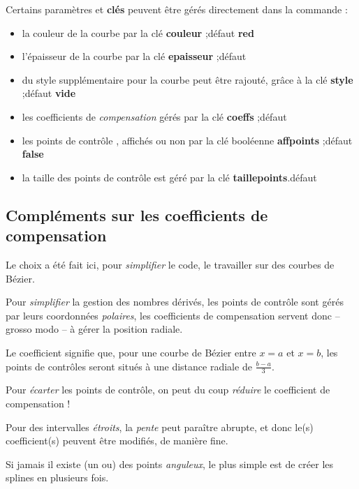 \documentclass{article}
\newcommand\ctex[1]{\tcbox[vignettelatex]{#1}}
\newcommand\Cle[1]{{\bfseries\sffamily\textlangle #1\textrangle}}
\begin{document}
\begin{codecles}
Certains paramètres et \Cle{clés} peuvent être gérés directement dans la commande \ctex{splinetikz} :
%
\begin{itemize}
	\item la couleur de la courbe par la {clé} \Cle{couleur} ;\hfill{}défaut \Cle{red}
	\item l'épaisseur de la courbe par la {clé} \Cle{epaisseur} ;\hfill{}défaut \Cle{1.25pt}
	\item du style supplémentaire pour la courbe peut être rajouté, grâce à la {clé} \Cle{style} ;\hfill{}défaut \Cle{vide}
	\item les coefficients de \textit{compensation} gérés par la {clé} \Cle{coeffs} ;\hfill{}défaut \Cle{3}
	\item les points de contrôle , affichés ou non par la {clé booléenne} \Cle{affpoints} ;\hfill{}défaut \Cle{false}
	\item la taille des points de contrôle est géré par la {clé} \Cle{taillepoints}.\hfill{}défaut \Cle{2pt}
\end{itemize}
\end{codecles}

\subsection{Compléments sur les coefficients de \og compensation \fg}

\begin{codeidee}
Le choix a été fait ici, pour \textit{simplifier} le code, le travailler sur des courbes de Bézier.

Pour \textit{simplifier} la gestion des nombres dérivés, les points de contrôle sont gérés par leurs coordonnées \textit{polaires}, les \textsf{coefficients de compensation} servent donc -- grosso modo -- à gérer la position radiale.

\smallskip

Le coefficient \Cle{3} signifie que, pour une courbe de Bézier entre $x=a$ et $x=b$, les points de contrôles seront situés à une distance radiale de $\frac{b-a}{3}$.

Pour \textit{écarter} les points de contrôle, on peut du coup \textit{réduire} le coefficient de compensation !

\medskip

Pour des intervalles \textit{étroits}, la \textit{pente} peut paraître abrupte, et donc le(s) coefficient(s) peuvent être modifiés, de manière fine.

\medskip

Si jamais il existe (un ou) des points \textit{anguleux}, le plus simple est de créer les splines en plusieurs fois.
\end{codeidee}
\end{document}
